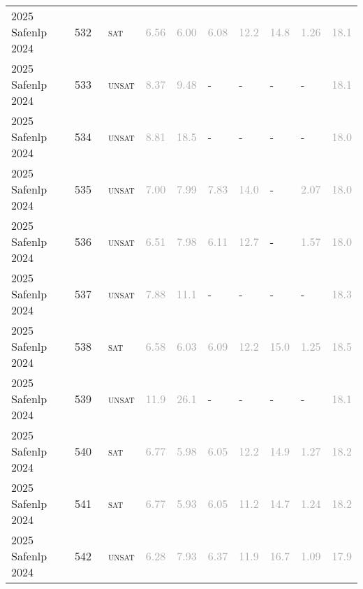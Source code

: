 \begin{center}
{\begin{longtable}{@{}llllllllll@{}}
2025 Safenlp 2024 & 532 & ~\textsc{sat} & \textcolor{darkgray}{6.56} & \textcolor{darkgray}{6.00} & \textcolor{darkgray}{6.08} & \textcolor{darkgray}{12.2} & \textcolor{darkgray}{14.8} & \textcolor{darkgray}{1.26} & \textcolor{darkgray}{18.1} \\
2025 Safenlp 2024 & 533 & ~\textsc{unsat} & \textcolor{darkgray}{8.37} & \textcolor{darkgray}{9.48} & - & - & - & - & \textcolor{darkgray}{18.1} \\
2025 Safenlp 2024 & 534 & ~\textsc{unsat} & \textcolor{darkgray}{8.81} & \textcolor{darkgray}{18.5} & - & - & - & - & \textcolor{darkgray}{18.0} \\
2025 Safenlp 2024 & 535 & ~\textsc{unsat} & \textcolor{darkgray}{7.00} & \textcolor{darkgray}{7.99} & \textcolor{darkgray}{7.83} & \textcolor{darkgray}{14.0} & - & \textcolor{darkgray}{2.07} & \textcolor{darkgray}{18.0} \\
2025 Safenlp 2024 & 536 & ~\textsc{unsat} & \textcolor{darkgray}{6.51} & \textcolor{darkgray}{7.98} & \textcolor{darkgray}{6.11} & \textcolor{darkgray}{12.7} & - & \textcolor{darkgray}{1.57} & \textcolor{darkgray}{18.0} \\
2025 Safenlp 2024 & 537 & ~\textsc{unsat} & \textcolor{darkgray}{7.88} & \textcolor{darkgray}{11.1} & - & - & - & - & \textcolor{darkgray}{18.3} \\
2025 Safenlp 2024 & 538 & ~\textsc{sat} & \textcolor{darkgray}{6.58} & \textcolor{darkgray}{6.03} & \textcolor{darkgray}{6.09} & \textcolor{darkgray}{12.2} & \textcolor{darkgray}{15.0} & \textcolor{darkgray}{1.25} & \textcolor{darkgray}{18.5} \\
2025 Safenlp 2024 & 539 & ~\textsc{unsat} & \textcolor{darkgray}{11.9} & \textcolor{darkgray}{26.1} & - & - & - & - & \textcolor{darkgray}{18.1} \\
2025 Safenlp 2024 & 540 & ~\textsc{sat} & \textcolor{darkgray}{6.77} & \textcolor{darkgray}{5.98} & \textcolor{darkgray}{6.05} & \textcolor{darkgray}{12.2} & \textcolor{darkgray}{14.9} & \textcolor{darkgray}{1.27} & \textcolor{darkgray}{18.2} \\
2025 Safenlp 2024 & 541 & ~\textsc{sat} & \textcolor{darkgray}{6.77} & \textcolor{darkgray}{5.93} & \textcolor{darkgray}{6.05} & \textcolor{darkgray}{11.2} & \textcolor{darkgray}{14.7} & \textcolor{darkgray}{1.24} & \textcolor{darkgray}{18.2} \\
2025 Safenlp 2024 & 542 & ~\textsc{unsat} & \textcolor{darkgray}{6.28} & \textcolor{darkgray}{7.93} & \textcolor{darkgray}{6.37} & \textcolor{darkgray}{11.9} & \textcolor{darkgray}{16.7} & \textcolor{darkgray}{1.09} & \textcolor{darkgray}{17.9} \\

\end{longtable}}
\end{center}
